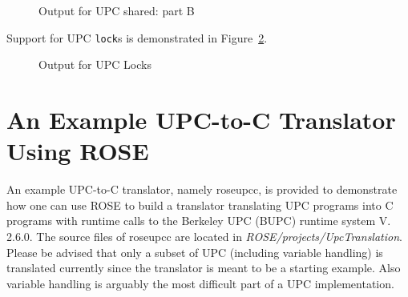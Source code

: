 \begin{figure}[!h]
{\indent
  {\mySmallFontSize
    \begin{latexonly}
    
    \end{latexonly}
    \begin{htmlonly}
    
    \end{htmlonly}
  }
}
\caption{Output for UPC shared: part B}
\label{Manual:UPC:sharedab}
\end{figure}

\clearpage
Support for UPC \lstinline{lock}s is demonstrated in
Figure~\ref{Manual:UPC:lock}. 
\begin{figure}[!h]
{\indent
  {\mySmallFontSize
    \begin{latexonly}
    
    \end{latexonly}
    \begin{htmlonly}
    
    \end{htmlonly}
  }
}
\caption{Output for UPC Locks}
\label{Manual:UPC:lock}
\end{figure}

\clearpage
\section{An Example UPC-to-C Translator Using ROSE}
An example UPC-to-C translator, namely roseupcc, is provided to 
demonstrate how one can use ROSE to build a translator translating UPC
programs into C programs with runtime calls to the Berkeley UPC (BUPC)
runtime system V. 2.6.0. 
The source files of roseupcc are located in
\textit{ROSE/projects/UpcTranslation}.
Please be advised that only a subset of UPC (including variable handling) is
translated currently since the translator is meant to be a starting example.
Also variable handling is arguably the most difficult part of a UPC
implementation.

